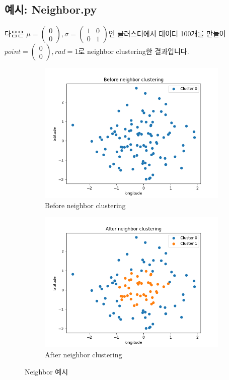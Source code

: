 \documentclass{oblivoir}
\begin{document}
  \subsection{예시: Neighbor.py}
  다음은 $\mu=\begin{pmatrix}0\\0\end{pmatrix},\sigma=\begin{pmatrix}1&0\\0&1\end{pmatrix}$인 클러스터에서 데이터 100개를 만들어 $point=\begin{pmatrix}0\\0\end{pmatrix},rad=1$로 neighbor clustering한 결과입니다.
  \begin{figure}[H]
    \begin{subfigure}[b]{.5\textwidth}
      \centering
      \caption{Before neighbor clustering}
      \includegraphics[width=\textwidth]{GPS_clustering_8.png}      
    \end{subfigure}%
    \begin{subfigure}[b]{.5\textwidth}
      \centering
      \caption{After neighbor clustering}
      \includegraphics[width=\textwidth]{GPS_clustering_9.png}
    \end{subfigure}
    \caption{Neighbor 예시}
  \end{figure}
\end{document}
